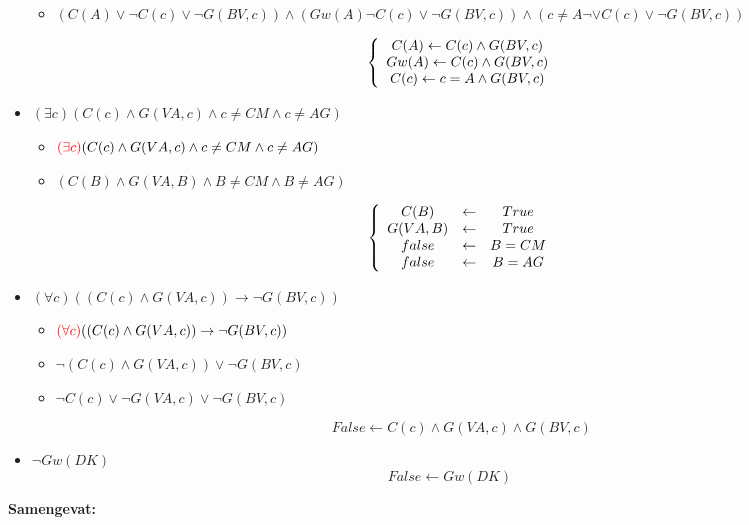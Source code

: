 \documentclass[alternative-exam.tex]{subfiles}
\begin{document}
\begin{itemize}
\begin{itemize}
\item 
$(C(A)\vee \neg C(c) \vee \neg G(BV,c)) \wedge (Gw(A) \neg C(c) \vee \neg G(BV,c))\wedge (c \neq A\neg \vee C(c) \vee \neg G(BV,c))$

\[
\left\{
\begin{array}{c c c}
C(A)\leftarrow  C(c) \wedge  G(BV,c)\\
Gw(A) \leftarrow  C(c) \wedge  G(BV,c)\\
C(c) \leftarrow c = A \wedge G(BV,c)\\
\end{array}
\right.
\]
\end{itemize}

\item $(\exists c) (C(c) \wedge G(VA,c) \wedge c\neq CM \wedge c \neq AG)$
\begin{itemize}
\item ${\color{red}(\exists c)} (C(c) \wedge G(VA,c) \wedge c\neq CM \wedge c \neq AG)$

\item $(C(B) \wedge G(VA,B) \wedge B\neq CM \wedge B \neq AG)$

\[
\left\{
\begin{array}{c c c}
C(B) &\leftarrow& True\\
G(VA,B) &\leftarrow& True\\
false &\leftarrow& B = CM\\
false &\leftarrow& B = AG\\
\end{array}
\right.
\]
\end{itemize}

\item $(\forall c) ((C(c) \wedge G(VA,c)) \rightarrow \neg G(BV,c))$
\begin{itemize}
\item ${\color{red}(\forall c)} ((C(c) \wedge G(VA,c)) \rightarrow \neg G(BV,c))$

\item $\neg(C(c) \wedge G(VA,c)) \vee \neg G(BV,c)$

\item $\neg C(c) \vee \neg G(VA,c) \vee \neg G(BV,c)$

\[
False \leftarrow C(c) \wedge G(VA,c) \wedge G(BV,c)
\]
\end{itemize}

\item $\neg Gw(DK)$
\[
False \leftarrow Gw(DK)
\]
\end{itemize}
\textbf{Samengevat:}
\end{document}
